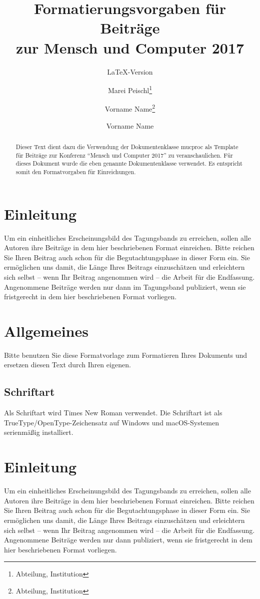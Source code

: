 \documentclass[ngerman,forcefinal
	]{mucproc}
\begin{document}
	
	
\title{Formatierungsvorgaben für Beiträge\\
	zur Mensch und Computer 2017}%
\subtitle{\LaTeX-Version}%
\author{Marei Peischl\thanks[inst1]{Abteilung, Institution}\and Vorname Name\thanks{Abteilung, Institution}\and Vorname Name}

	
\maketitle

	
\begin{abstract}
Dieser Text dient dazu die Verwendung der Dokumentenklasse \textsf{mucproc} als Template für Beiträge zur Konferenz \enquote{Mensch und Computer 2017} zu veranschaulichen. Für dieses Dokument wurde die eben genannte Dokumentenklasse verwendet. Es entspricht somit den Formatvorgaben für Einreichungen.
\end{abstract}

\section{Einleitung}
Um ein einheitliches Erscheinungsbild des Tagungsbands zu erreichen, sollen alle Autoren ihre Beiträge in dem hier beschriebenen Format einreichen. Bitte reichen Sie Ihren Beitrag auch schon für die Begutachtungsphase in dieser Form ein. Sie ermöglichen uns damit, die Länge Ihres Beitrags einzuschätzen und erleichtern sich selbst – wenn Ihr Beitrag angenommen wird – die Arbeit für die Endfassung. Angenommene Beiträge werden nur dann im Tagungsband publiziert, wenn sie fristgerecht in dem hier beschriebenen Format vorliegen.
\section{Allgemeines}
Bitte benutzen Sie diese Formatvorlage zum Formatieren Ihres Dokuments und ersetzen diesen Text durch Ihren eigenen.
\subsection{Schriftart}
Als Schriftart wird Times New Roman verwendet. Die Schriftart ist als TrueType/OpenType-Zeichensatz auf Windows und macOS-Systemen serienmäßig installiert.


\section{Einleitung}
Um ein einheitliches Erscheinungsbild des Tagungsbands zu erreichen, sollen alle Autoren ihre Beiträge in dem hier beschriebenen Format einreichen. Bitte reichen Sie Ihren Beitrag auch schon für die Begutachtungsphase in dieser Form ein. Sie ermöglichen uns damit, die Länge Ihres Beitrags einzuschätzen und erleichtern sich selbst -- wenn Ihr Beitrag angenommen wird -- die Arbeit für die Endfassung. Angenommene Beiträge werden nur dann publiziert, wenn sie fristgerecht in dem hier beschriebenen Format vorliegen.
\end{document}
